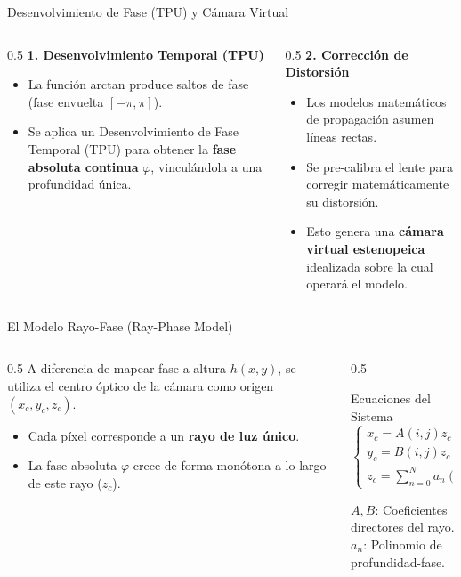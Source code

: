 \documentclass[aspectratio=169]{beamer}
\begin{document}
	\begin{frame}{Desenvolvimiento de Fase (TPU) y Cámara Virtual}
		\begin{columns}
			\begin{column}{0.5\textwidth}
				\textbf{1. Desenvolvimiento Temporal (TPU)}
				\begin{itemize}
					\item La función arctan produce saltos de fase (fase envuelta $[-\pi, \pi]$).
					\item Se aplica un Desenvolvimiento de Fase Temporal (TPU) para obtener la \textbf{fase absoluta continua} $\varphi$, vinculándola a una profundidad única.
				\end{itemize}
			\end{column}
			\begin{column}{0.5\textwidth}
				\textbf{2. Corrección de Distorsión}
				\begin{itemize}
					\item Los modelos matemáticos de propagación asumen líneas rectas.
					\item Se pre-calibra el lente para corregir matemáticamente su distorsión.
					\item Esto genera una \textbf{cámara virtual estenopeica} idealizada sobre la cual operará el modelo.
				\end{itemize}
			\end{column}
		\end{columns}
	\end{frame}
	
	\begin{frame}{El Modelo Rayo-Fase (Ray-Phase Model)}
		\begin{columns}
			\begin{column}{0.5\textwidth}
				A diferencia de mapear fase a altura $h(x,y)$, se utiliza el centro óptico de la cámara como origen $(x_c, y_c, z_c)$.
				\begin{itemize}
					\item Cada píxel corresponde a un \textbf{rayo de luz único}.
					\item La fase absoluta $\varphi$ crece de forma monótona a lo largo de este rayo ($z_c$).
				\end{itemize}
			\end{column}
			\begin{column}{0.5\textwidth}
				\begin{block}{Ecuaciones del Sistema}
					\begin{equation*}
						\begin{cases}
							x_c = A(i,j)z_c \\
							y_c = B(i,j)z_c \\
							z_c = \sum_{n=0}^{N} a_n(i,j)\varphi^n
						\end{cases}
					\end{equation*}
				\end{block}
				\small{$A, B$: Coeficientes directores del rayo.\\ $a_n$: Polinomio de profundidad-fase.}
			\end{column}
		\end{columns}
	\end{frame}
	
\end{document}
